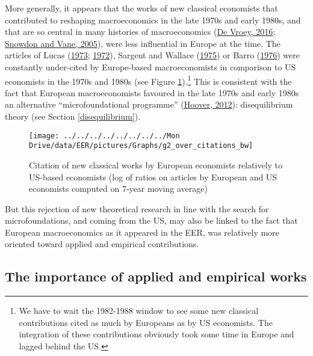 \documentclass[
  12pt,
  onecolumn]{article}
\begin{document}
More generally, it appears that the works of new classical economists
that contributed to reshaping macroeconomics in the late 1970s and early
1980s, and that are so central in many histories of macroeconomics
(\protect\hyperlink{ref-devroey2016}{De Vroey, 2016};
\protect\hyperlink{ref-snowdon2005}{Snowdon and Vane, 2005}), were less
influential in Europe at the time. The articles of Lucas
(\protect\hyperlink{ref-lucas1973}{1973};
\protect\hyperlink{ref-lucas1972}{1972}), Sargent and Wallace
(\protect\hyperlink{ref-sargent1975}{1975}) or Barro
(\protect\hyperlink{ref-barro1976}{1976}) were constantly under-cited by
Europe-based macroeconomists in comparison to US economists in the 1970s
and 1980s (see Figure \ref{fig:plot-new-classical}).\footnote{We have to
  wait the 1982-1988 window to see some new classical contributions
  cited as much by Europeans as by US economists. The integration of
  these contributions obviously took some time in Europe and lagged
  behind the US.} This is consistent with the fact that European
macroeconomists favoured in the late 1970s and early 1980s an
alternative ``microfoundational programme''
(\protect\hyperlink{ref-hoover2012}{Hoover, 2012}): disequilibrium
theory (see Section \ref{disequilibrium}).

\begin{figure}[h]

{\centering \texttt{[image: ../../../../../../../../Mon Drive/data/EER/pictures/Graphs/g2\_over\_citations\_bw]} 

}

\caption{Citation of new classical works by European economists relatively to US-based economists (log of ratios on articles by European and US economists computed on 7-year moving average)}\label{fig:plot-new-classical}
\end{figure}

But this rejection of new theoretical research in line with the search
for microfoundations, and coming from the US, may also be linked to the
fact that European macroeconomics as it appeared in the EER, was
relatively more oriented toward applied and empirical contributions.

\hypertarget{the-importance-of-applied-and-empirical-works}{%
\subsection{The importance of applied and empirical
works}\label{the-importance-of-applied-and-empirical-works}}
\end{document}
